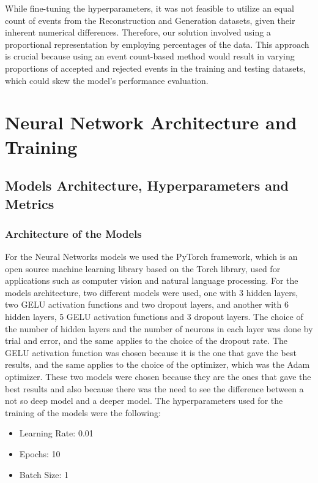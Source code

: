 \documentclass{article}
\begin{document}
While fine-tuning the hyperparameters, it was not feasible to utilize an equal count of events from the Reconstruction and Generation datasets, given their inherent numerical differences. Therefore, our solution involved using a proportional representation by employing percentages of the data. This approach is crucial because using an event count-based method would result in varying proportions of accepted and rejected events in the training and testing datasets, which could skew the model's performance evaluation.


\section{Neural Network Architecture and Training}

\subsection{Models Architecture, Hyperparameters and Metrics}

\subsubsection{Architecture of the Models}

For the Neural Networks models we used the PyTorch framework, which is an open source machine learning library based on the Torch library, used for applications such as computer vision and natural language processing.
For the models architecture, two different models were used, one with 3 hidden layers, two GELU activation functions and two dropout layers, and another with 6 hidden layers, 5 GELU activation functions and 3 dropout layers.
The choice of the number of hidden layers and the number of neurons in each layer was done by trial and error, and the same applies to the choice of the dropout rate. 
The GELU activation function was chosen because it is the one that gave the best results, and the same applies to the choice of the optimizer, which was the Adam optimizer.
These two models were chosen because they are the ones that gave the best results and also because there was the need to see the difference between a not so deep model and a deeper model.
The hyperparameters used for the training of the models were the following:
\begin{itemize}
    \item Learning Rate: 0.01
    \item Epochs: 10
    \item Batch Size: 1
\end{itemize}
\end{document}
